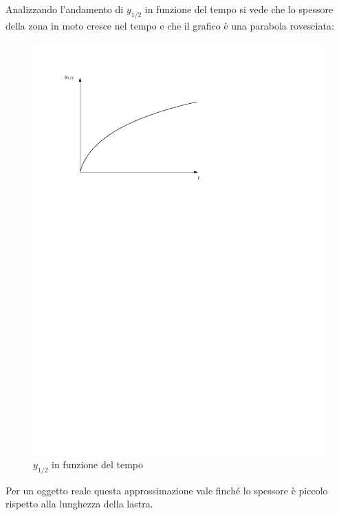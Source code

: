 Analizzando l'andamento di $y_{1/2}$ in funzione del tempo si vede che lo spessore della zona in moto cresce nel tempo e che il grafico è una parabola rovesciata:
	\begin{figure}[ht]
		\includegraphics[scale=0.7]{./3.6 Soluzioni esatte equazioni di Navier-Stokes/3.6-13}
		\centering
		\caption{$y_{1/2}$ in funzione del tempo}
	\end{figure}
%
Per un oggetto reale questa approssimazione vale finché lo spessore è piccolo rispetto alla lunghezza della lastra.

